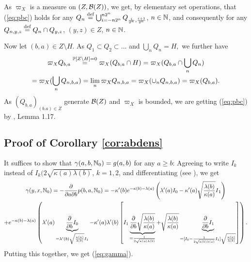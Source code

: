 \documentclass{aptpub}
\begin{document}
As $\varpi_X$ is a measure on $(Z,\B(Z))$, we get, by elementary set operations,
that (\ref{eq:pbc}) holds for any $Q_{n}\defined\bigcup_{i=-n2^{n}}^{n2^{n}}Q_{\frac{i}{2^{n}},\frac{i+1}{2^{n}}}$,
$n\in\N$, and consequently for any 
$Q_{n,y,z}\defined Q_{n}\cap Q_{y,z}$, $(y,z)\in Z$, $n\in\N$.

Now let $(b,a)\in Z\setminus H.$  As $Q_{1}\subset Q_{2}\subset\dots$
and $\bigcup_{n}Q_{n}=H,$ we further have
\begin{multline*}
\varpi_X Q_{b,a}\stackrel{\P[Z\setminus H]=0}{=}\varpi_X(Q_{b,a}\cap H)
=\varpi_X(Q_{b,a}\cap \bigcup_n Q_n)
\\
=\varpi_X(\bigcup_n Q_{n,b,a})
=\lim_{n}\varpi_X Q_{n,b,a}
=\varpi_X(\cup_{n}Q_{n,b,a})=\varpi_X(Q_{b,a}).
\end{multline*}
As $(Q_{b,a})_{(b.a)\in Z}$ generate $\B(Z)$ and $\varpi_X$ is bounded, we are getting
(\ref{eq:pbc}) by \cite{Kallenberg02}, Lemma 1.17.


\subsection{Proof of Corollary \ref{cor:abdens}}
\label{app:abdens}

It suffices to show that $\gamma(a,b,\N_0)=g(a,b)$ for any $a \geq b$: Agreeing to write $I_k$ instead of $I_k (2\sqrt{\kappa(a)\lambda(b)}$, $k=1,2$, and differentiating (see \cite{wolframbessel}), we get
\begin{multline*} 
\gamma(y,x,\N_0)=-\frac{\partial}{\partial a \partial b } p(b,a,\N_0)=
-\kappa'(b)e^{-\kappa(b)-\lambda(a)}\left(\lambda'(a)I_{0}-\kappa'(a)\sqrt{\frac{\lambda(b)}{\kappa(a)}}I{}_{1}\right)\\+e^{-\kappa(b)-\lambda(a)}
\left(\lambda'(a)
\underbrace{\frac\partial{\partial b}I_{0}}
_{=\lambda'(b)\sqrt{\frac{\kappa(a)}{\lambda(b)}} I_{1}}
-
\kappa'(a)\lambda'(b)
\left[
I_1 
\underbrace{
\frac{\partial}{\partial b}\sqrt{\frac{\lambda(b)}{\kappa(a)}}
}
_
{
=\frac{1}{2\sqrt{\kappa(a)\lambda(b)}}
}
+
\sqrt{\frac{\lambda(b)}{\kappa(a)}} 
\underbrace{
\frac{\partial}{\partial b} I_{1}
}_
{=[I_{0}-\frac1{2\sqrt{\kappa(b)\lambda(a)}}I_{1}]
\sqrt{\frac{\kappa(a)}{\lambda(b)}}}
\right]\right).
\end{multline*}
Putting this together, we get (\ref{eq:gamma}).
\end{document}
